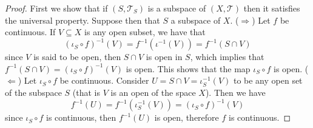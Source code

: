 \begin{proof}
  First we show that if \((S, \mathcal T_S)\) is a subspace of \((X, \mathcal
  T)\) then it satisfies the universal property. Suppose then that \(S\) a
  subspace of \(X\). (\(\Rightarrow\)) Let \(f\) be continuous. If \(V \subseteq
  X\) is any open subset, we have that
  \[
    (\iota_S \circ f)^{-1}(V) = f^{-1}(\iota^{-1}(V)) = f^{-1}(S \cap V)
  \] 
  since \(V\) is said to be open, then \(S \cap V\) is open in \(S\), which
  implies that \(f^{-1}(S \cap V) = (\iota_S \circ f)^{-1}(V)\) is open. This
  shows that the map \(\iota_S \circ f\) is open. (\(\Leftarrow\)) Let \(\iota_S
  \circ f\) be continuous. Consider \(U = S \cap V = \iota_S^{-1}(V)\) to be any
  open set of the subspace \(S\) (that is \(V\) is an open of the space \(X\)).
  Then we have
  \[
    f^{-1}(U) = f^{-1}(\iota_S^{-1}(V)) = (\iota_S \circ f)^{-1}(V)
  \] 
  since \(\iota_S \circ f\) is continuous, then \(f^{-1}(U)\) is open, therefore
  \(f\) is continuous.


\end{proof}
